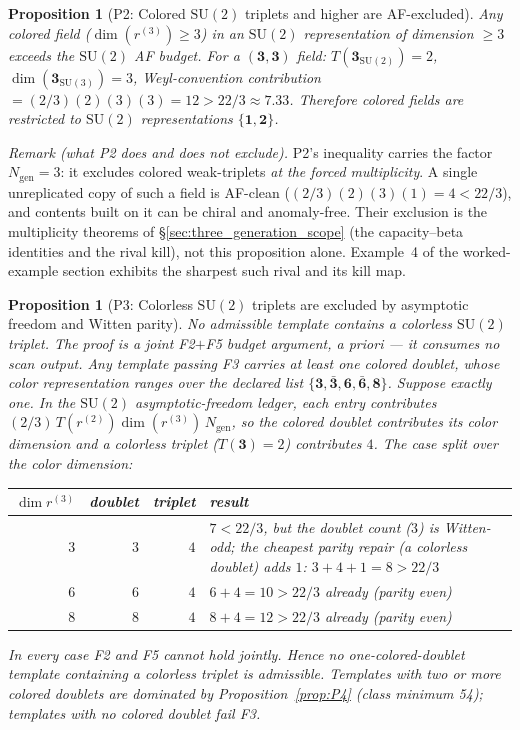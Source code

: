 \documentclass[11pt]{article}
\newtheorem{proposition}[theorem]{Proposition}
\theoremstyle{definition}
\newcommand{\SU}{\mathrm{SU}}
\begin{document}
\begin{proposition}[P2: Colored $\SU(2)$ triplets and higher are AF-excluded]
\label{prop:P2}
Any colored field ($\dim(r^{(3)}) \ge 3$) in an $\SU(2)$
representation of dimension $\ge 3$ exceeds the $\SU(2)$ AF budget.
For a $(\mathbf{3}, \mathbf{3})$ field: $T(\mathbf{3}_{\SU(2)}) = 2$,
$\dim(\mathbf{3}_{\SU(3)}) = 3$, Weyl-convention contribution
$= (2/3)(2)(3)(3) = 12 > 22/3 \approx 7.33$.  Therefore colored fields are
restricted to $\SU(2)$ representations $\{\mathbf{1}, \mathbf{2}\}$.
\end{proposition}

\noindent\emph{Remark (what P2 does and does not exclude).}  P2's inequality
carries the factor $N_{\mathrm{gen}} = 3$: it excludes colored weak-triplets
\emph{at the forced multiplicity}.  A single unreplicated copy of such a field
is AF-clean ($ (2/3)(2)(3)(1) = 4 < 22/3$), and contents built on it can be
chiral and anomaly-free.  Their exclusion is the multiplicity theorems of
\S\ref{sec:three_generation_scope} (the capacity--beta identities and the
rival kill), not this proposition alone.  Example~4 of the worked-example
section exhibits the sharpest such rival and its kill map.

\begin{proposition}[P3: Colorless $\SU(2)$ triplets are excluded by
asymptotic freedom and Witten parity]
\label{prop:P3}
No admissible template contains a colorless $\SU(2)$ triplet.  The
proof is a joint F2$+$F5 budget argument, a priori --- it consumes no
scan output.  Any template passing F3 carries at least one colored
doublet, whose color representation ranges over the declared list
$\{\mathbf{3}, \bar{\mathbf{3}}, \mathbf{6}, \bar{\mathbf{6}},
\mathbf{8}\}$.  Suppose exactly one.  In the $\SU(2)$
asymptotic-freedom ledger, each entry contributes
$(2/3)\,T(r^{(2)})\dim(r^{(3)})\,N_{\mathrm{gen}}$, so the colored
doublet contributes its color dimension and a colorless triplet
($T(\mathbf{3}) = 2$) contributes $4$.  The case split over the color
dimension:
\begin{center}\small
\begin{tabular}{@{}rrrp{6.4cm}@{}}
\toprule
$\dim r^{(3)}$ & doublet & triplet & result \\
\midrule
$3$ & $3$ & $4$ & $7 < 22/3$, but the doublet count ($3$) is Witten-odd; the cheapest parity repair (a colorless doublet) adds $1$: $3 + 4 + 1 = 8 > 22/3$ \\
$6$ & $6$ & $4$ & $6 + 4 = 10 > 22/3$ already (parity even) \\
$8$ & $8$ & $4$ & $8 + 4 = 12 > 22/3$ already (parity even) \\
\bottomrule
\end{tabular}
\end{center}
In every case F2 and F5 cannot hold jointly.  Hence no
one-colored-doublet template containing a colorless triplet is
admissible.  Templates with two or more colored doublets are dominated
by Proposition~\ref{prop:P4} (class minimum 54); templates with no
colored doublet fail F3.
\end{proposition}
\end{document}
